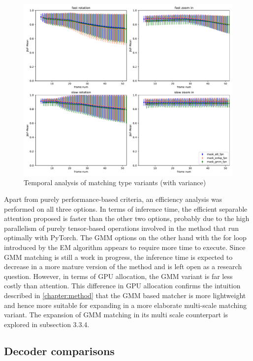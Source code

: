 \begin{figure}[ht!]
    \centering
    \includegraphics[width=1.\linewidth]{figures/04_experiments/matching_ablations/mask_att_fpn-mask_estep_fpn-mask_gmm_fpn-movement_all_variance.pdf}
    \caption{Temporal analysis of matching type variants (with variance)}
    \label{fig:matching_ablations_all_variance}
    
\end{figure}
\newpage
Apart from purely performance-based criteria, an efficiency analysis was performed on all three options. In terms of inference time, the efficient separable attention proposed is faster than the other two options, probably due to the high parallelism of purely tensor-based operations involved in the method that run optimally with PyTorch. The GMM options on the other hand with the for loop introduced by the EM algorithm appears to require more time to execute. Since GMM matching is still a work in progress, the inference time is expected to decrease in a more mature version of the method and is left open as a research question. However, in terms of GPU allocation, the GMM variant is far less costly than attention. This difference in GPU allocation confirms the intuition described in \autoref{chapter:method} that the GMM based matcher is more lightweight and hence more suitable for expanding in a more elaborate multi-scale matching variant. The expansion of GMM matching in its multi scale counterpart is explored in subsection 3.3.4.
\subsection{Decoder comparisons}

